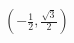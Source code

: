 \documentclass[preview]{standalone}
\begin{document}
\begin{align*}
\left(-\frac{1}{2}, \frac{\sqrt{3}}{2}\right)
\end{align*}
\end{document}
